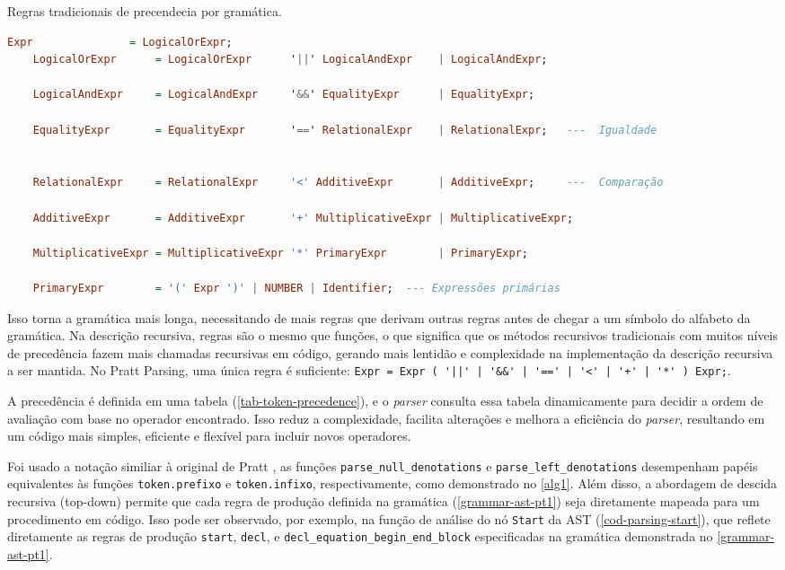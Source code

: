 \begin{codigo}[htb]
    \caption{\small Regras tradicionais de precendecia por gramática. }
    \label{cod-regras-tradicionais}
\begin{lstlisting}[language=haskell, numbers=none, inputencoding=utf8]
    Expr               = LogicalOrExpr;
    LogicalOrExpr      = LogicalOrExpr      '||' LogicalAndExpr    | LogicalAndExpr;

    LogicalAndExpr     = LogicalAndExpr     '&&' EqualityExpr      | EqualityExpr;

    EqualityExpr       = EqualityExpr       '==' RelationalExpr    | RelationalExpr;   ---  Igualdade


    RelationalExpr     = RelationalExpr     '<' AdditiveExpr       | AdditiveExpr;     ---  Comparação

    AdditiveExpr       = AdditiveExpr       '+' MultiplicativeExpr | MultiplicativeExpr;

    MultiplicativeExpr = MultiplicativeExpr '*' PrimaryExpr        | PrimaryExpr;

    PrimaryExpr        = '(' Expr ')' | NUMBER | Identifier;  --- Expressões primárias

\end{lstlisting}
\end{codigo}


Isso torna a gramática mais longa, necessitando de mais regras que derivam outras regras antes de chegar a um símbolo do alfabeto da gramática. Na descrição recursiva, regras são o mesmo que funções, o que significa que os métodos recursivos tradicionais com muitos níveis de precedência fazem mais chamadas recursivas em código, gerando mais lentidão e complexidade na implementação da descrição recursiva a ser mantida. No Pratt Parsing, uma única regra é suficiente:
\verb`Expr = Expr ( '||' | '&&' | '==' | '<' | '+' | '*' ) Expr;`.

A precedência é definida em uma tabela (\autoref{tab-token-precedence}), e o \textit{parser} consulta essa tabela dinamicamente para decidir a ordem de avaliação com base no operador encontrado. Isso reduz a complexidade, facilita alterações e melhora a eficiência do \textit{parser}, resultando em um código mais simples, eficiente e flexível para incluir novos operadores.

Foi usado a notação similiar à original de Pratt \cite{pratt}, as funções \verb"parse_null_denotations" e \texttt{parse\_left\_denotations} desempenham papéis equivalentes às funções \texttt{token.prefixo} e \texttt{token.infixo}, respectivamente, como demonstrado no \autoref{alg1}. Além disso, a abordagem de descida recursiva (top-down) permite que cada regra de produção definida na gramática (\autoref{grammar-ast-pt1}) seja diretamente mapeada para um procedimento em código. Isso pode ser observado, por exemplo, na função de análise do nó \texttt{Start} da AST (\autoref{cod-parsing-start}), que reflete diretamente as regras de produção \texttt{start}, \texttt{decl}, e \texttt{decl\_equation\_begin\_end\_block} especificadas na gramática demonstrada no \autoref{grammar-ast-pt1}.

